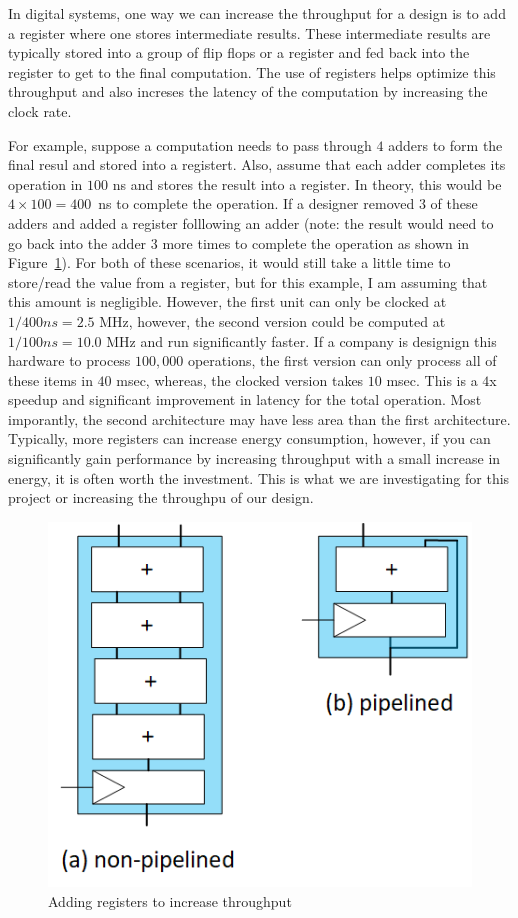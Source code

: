 \documentclass{article}
\begin{document}
In digital systems, one way we can increase the throughput for a
design is to add a register where one stores intermediate results.
These intermediate results are typically stored into a group of flip
flops or a register and fed back into the register to get to the final
computation.  The use of registers helps optimize this throughput and
also increses the latency of the computation by increasing the clock
rate.

For example, suppose a computation needs to pass through $4$
adders to form the final resul and stored into a registert.
Also, assume that each adder
completes its operation in $100$ ns and stores the result into a
register.  In theory, this would be $4 \times 100 = 400$~ns to
complete the operation.
If a designer removed $3$ of these adders and
added a register folllowing an adder (note: the result would need to go back
into the adder $3$ more times to complete the operation as shown in
Figure~\ref{throughput1.fig}).
For both of these scenarios, it
would still take a little time to store/read the value from a
register, but for this example, I am assuming that this amount is
negligible.  
However, the first unit can only be clocked at $1/400ns = 2.5$ MHz,
however, the second version could be computed at $1/100ns = 10.0$ MHz and run
significantly faster.  If a company is designign this hardware to process $100,000$
operations, the first version can only process all of these items in
$40$ msec, whereas, the clocked version takes $10$ msec.  This is a
$4$x speedup and significant improvement in latency for the total
operation.
Most imporantly, the second architecture may have less area
than the first architecture.  Typically, more registers can increase energy
consumption, however, if you can significantly gain performance by increasing
throughput with a small increase in energy, it is often worth the
investment.  This is what we are investigating for this project or
increasing the throughpu of our design.
\begin{figure} [t!]
  \centering
  \includegraphics[scale=1.2]{throughput1.png}
  \caption{Adding registers to increase throughput}
  \label{throughput1.fig}
\end{figure}
\end{document}
